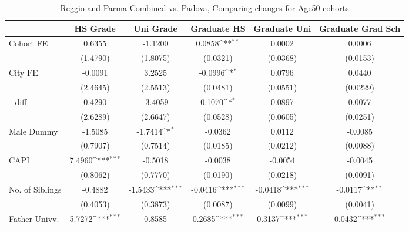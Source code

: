 \begin{table}[htbp]\centering
\def\sym#1{\ifmmode^{#1}\else\(^{#1}\)\fi}
\caption{Reggio and Parma Combined vs. Padova, Comparing changes for Age50 cohorts}
\begin{tabular}{l*{5}{c}}
\toprule
            &\multicolumn{1}{c}{HS Grade}&\multicolumn{1}{c}{Uni Grade}&\multicolumn{1}{c}{Graduate HS}&\multicolumn{1}{c}{Graduate Uni}&\multicolumn{1}{c}{Graduate Grad Sch}\\
\midrule
Cohort FE   &      0.6355         &     -1.1200         &      0.0858\sym{**} &      0.0002         &      0.0006         \\
            &    (1.4790)         &    (1.8075)         &    (0.0321)         &    (0.0368)         &    (0.0153)         \\
\addlinespace
City FE     &     -0.0091         &      3.2525         &     -0.0996\sym{*}  &      0.0796         &      0.0440         \\
            &    (2.4645)         &    (2.5513)         &    (0.0481)         &    (0.0551)         &    (0.0229)         \\
\addlinespace
\_diff       &      0.4290         &     -3.4059         &      0.1070\sym{*}  &      0.0897         &      0.0077         \\
            &    (2.6289)         &    (2.6647)         &    (0.0528)         &    (0.0605)         &    (0.0251)         \\
\addlinespace
Male Dummy  &     -1.5085         &     -1.7414\sym{*}  &     -0.0362         &      0.0112         &     -0.0085         \\
            &    (0.7907)         &    (0.7514)         &    (0.0185)         &    (0.0212)         &    (0.0088)         \\
\addlinespace
CAPI        &      7.4960\sym{***}&     -0.5018         &     -0.0038         &     -0.0054         &     -0.0045         \\
            &    (0.8062)         &    (0.7770)         &    (0.0190)         &    (0.0218)         &    (0.0091)         \\
\addlinespace
No. of Siblings&     -0.4882         &     -1.5433\sym{***}&     -0.0416\sym{***}&     -0.0418\sym{***}&     -0.0117\sym{**} \\
            &    (0.4053)         &    (0.3873)         &    (0.0087)         &    (0.0099)         &    (0.0041)         \\
\addlinespace
Father Univv.&      5.7272\sym{***}&      0.8585         &      0.2685\sym{***}&      0.3137\sym{***}&      0.0432\sym{***}\\

\end{tabular}
\end{table}
